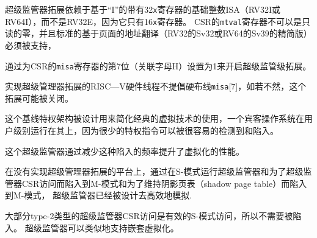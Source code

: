 超级监管器拓展依赖于基于“I”的带有32{\tt x}寄存器的基础整数ISA（RV32I或RV64I），而不是RV32E，因为它只有16{\tt x}寄存器。
CSR的{\tt mtval}寄存器不可以是只读的零，并且标准的基于页面的地址翻译（RV32的Sv32或RV64的Sv39的精简版）必须被支持，

通过为CSR的{\tt misa}寄存器的第7位（关联字母H）设置为1来开启超级监管级拓展。

实现超级管理器拓展的RISC—V硬件线程不提倡硬布线{\tt misa}[7]，如若不然，这个拓展可能被关闭。

\begin{commentary}

这个基线特权架构被设计用来简化经典的虚拟技术的使用，一个宾客操作系统在用户级别运行在其上，因为很少的特权指令可以被很容易的检测到和陷入。

这个超级监管器通过减少这种陷入的频率提升了虚拟化的性能。

在没有实现超级管理器拓展的平台上，通过在S-模式运行超级监管器和为了超级监管器CSR访问而陷入到M-模式和为了维持阴影页表（shadow page table）而陷入到M-模式，
超级监管器已经被设计去高效地模拟.

大部分type-2类型的超级监管器CSR访问是有效的S-模式访问，所以不需要被陷入。
超级监管器可以类似地支持嵌套虚拟化。
\end{commentary}

